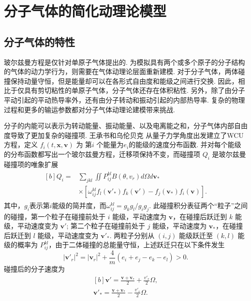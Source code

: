 
\chapter{分子气体的简化动理论模型}

\section{分子气体的特性}\label{sec:model}

玻尔兹曼方程是仅针对单原子气体提出的. 为模拟具有两个或多个原子的分子结构的气体的动力学行为，则需要在气体动理论层面重新建模. 对于分子气体，两体碰撞保持动量守恒，但是能量却可以在各形式自由度和能级之间进行交换. 因此，相比于仅具有剪切粘性的单原子气体，分子气体还存在体积粘性. 另外，除了由分子平动引起的平动热导率外，还有由分子转动和振动引起的内部热导率. 复杂的物理过程和更多的输运参数都对分子气体动理论建模带来挑战. 

分子的内能可以表示为转动能量、振动能量、以及电离能之和，分子气体内部自由度导致了更加复杂的碰撞项. 王承书和乌伦贝克 从量子力学角度出发建立了WCU方程，定义 $f_i(t,\bm{x},\bm{v})$ 为 第$i$ 个能量为$e_i$的能级的速度分布函数. 并对每个能级的分布函数都写出一个玻尔兹曼方程，迁移项保持不变，而碰撞项 $Q_i$ 是玻尔兹曼碰撞项的唯象扩展
\begin{eqnarray}\label{chapter1_WCU_Boltzmann0}
\begin{aligned}[b]
Q_i=&\sum_{jkl}\iint
P_{ij}^{kl}B(\theta,{v_r})
d\Omega
d\bm{v}_\ast\\
&\times\left[\omega_{ij}^{kl}f_l(\bm{v}'_{\ast})f_k(\bm{v}')-f_j(\bm{v}_{\ast})f_i(\bm{v})\right].
\end{aligned}
\end{eqnarray}
其中，$g_i$表示第$ i $能级的简并度，而$\omega_{ij}^{kl}=g_kg_l/g_ig_j$. 此碰撞积分表征两个“粒子”之间的碰撞，第一个粒子在碰撞前处于 $ i $ 能级，平动速度为 $\bm{v}$，在碰撞后跃迁到 $ k $ 能级，平动速度变为 $\bm{v}'$; 第二个粒子在碰撞前处于 $j$ 能级，平动速度为 $\bm{v}_\ast$，在碰撞后跃迁到 $ l $ 能级，平动速度变为 $\bm{v}'_\ast$. 两粒子分别从 $(i,j)$ 能级跃迁至 $(k,l)$ 能级的概率为 $P_{ij}^{kl}$，由于二体碰撞的总能量守恒，上述跃迁只在以下条件发生
\begin{equation}
|\bm{v}'_r|^2=|\bm{v}_r|^2+\frac{4}{m}(e_{i}+e_{j}-e_{k}-e_{l})>0.
\end{equation}
碰撞后的分子速度为
\begin{equation}
\begin{aligned}[b]
\bm{v}'=\frac{\bm{v}+\bm{v}_\ast}{2}+\frac{v'_r}{2}\Omega,
\\
\bm{v}'_\ast=\frac{\bm{v}+\bm{v}_\ast}{2}-\frac{v'_r}{2}\Omega.
\end{aligned}
\end{equation}

